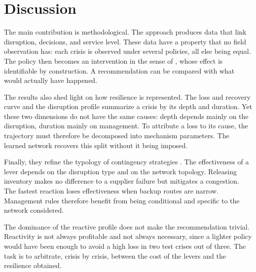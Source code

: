 \section{Discussion}
\label{sec:5}

\label{sec:5.1}

The main contribution is methodological. The approach produces data that link disruption, decisions, and service level. These data have a property that no field observation has: each crisis is observed under several policies, all else being equal. The policy then becomes an intervention in the sense of \citet{pearl2009}, whose effect is identifiable by construction. A recommendation can be compared with what would actually have happened.

The results also shed light on how resilience is represented. The loss and recovery curve \citep{bruneau2003} and the disruption profile \citep{sheffi2005book} summarize a crisis by its depth and duration. Yet these two dimensions do not have the same causes: depth depends mainly on the disruption, duration mainly on management. To attribute a loss to its cause, the trajectory must therefore be decomposed into mechanism parameters. The learned network recovers this split without it being imposed.

Finally, they refine the typology of contingency strategies \citep{tomlin2006,chopra2004}. The effectiveness of a lever depends on the disruption type and on the network topology. Releasing inventory makes no difference to a supplier failure but mitigates a congestion. The fastest reaction loses effectiveness when backup routes are narrow. Management rules therefore benefit from being conditional and specific to the network considered.

The dominance of the reactive profile does not make the recommendation trivial. Reactivity is not always profitable and not always necessary, since a lighter policy would have been enough to avoid a high loss in two test crises out of three. The task is to arbitrate, crisis by crisis, between the cost of the levers and the resilience obtained.

\label{sec:5.2}

